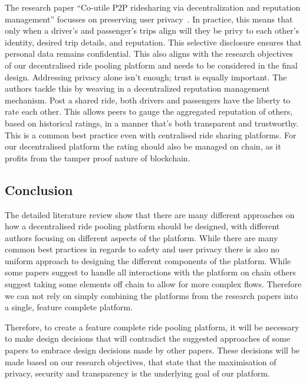 The research paper ``Co-utile P2P ridesharing via decentralization and reputation management'' focusses on preserving user privacy~\cite{Sanchez.2016}. In practice, this means that only when a driver's and passenger's trips align will they be privy to each other's identity, desired trip details, and reputation. This selective disclosure ensures that personal data remains confidential. This also aligns with the research objectives of our decentralised ride pooling platform and needs to be considered in the final design.
Addressing privacy alone isn't enough; trust is equally important. The authors tackle this by weaving in a decentralized reputation management mechanism. Post a shared ride, both drivers and passengers have the liberty to rate each other. This allows peers to gauge the aggregated reputation of others, based on historical ratings, in a manner that's both transparent and trustworthy. This is a common best practice even with centralised ride sharing platforms. For our decentralised platform the rating should also be managed on chain, as it profits from the tamper proof nature of blockchain.

\subsection{Conclusion}
The detailed literature review show that there are many different approaches on how a decentralised ride pooling platform should be designed, with different authors focusing on different aspects of the platform. While there are many common best practices in regards to safety and user privacy there is also no uniform approach to designing the different components of the platform. While some papers suggest to handle all interactions with the platform on chain others suggest taking some elements off chain to allow for more complex flows. Therefore we can not rely on simply combining the platforms from the research papers into a single, feature complete platform.

Therefore, to create a feature complete ride pooling platform, it will be necessary to make design decisions that will contradict the suggested approaches of some papers to embrace design decisions made by other papers. These decisions will be made based on our research objectives, that state that the maximisation of privacy, security and transparency is the underlying goal of our platform.


